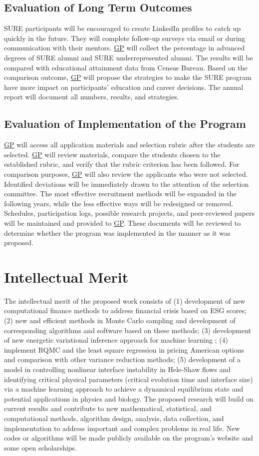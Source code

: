 \documentclass[11pt]{NSFamsart}
\newcommand{\GP}{\hyperlink{GPlink}{GP}\xspace}
\begin{document}
\subsection{Evaluation of Long Term Outcomes}

SURE participants will be encouraged to create LinkedIn profiles to catch up quickly in the future. They will complete follow-up surveys via email or during communication with their mentors. \GP will collect the percentage in advanced degrees of SURE alumni and SURE underrepresented alumni. The results will be compared with educational attainment data from Census Bureau. Based on the comparison outcome, \GP will propose the strategies to make the SURE program have more impact on participants’ education and career decisions. The annual report will document all numbers, results, and strategies.

\subsection{Evaluation of Implementation of the Program}
\GP will access all application materials and selection rubric after the students are selected. \GP will review materials, compare the students chosen to the established rubric, and verify that the rubric criterion has been followed. For comparison purposes, \GP will also
review the applicants who were not selected. Identified deviations will be immediately drawn to the attention of the selection committee. The most effective recruitment methods will be expanded in the following years, while the less effective ways will be redesigned or removed. Schedules, participation logs, possible research projects, and peer-reviewed papers will be maintained and provided to \GP. These documents will be reviewed to determine whether the program was implemented in the manner as it was proposed.

 
\section{Intellectual Merit}
The intellectual merit of the proposed work consists of (1) development of new computational finance methods to address financial crisis based on ESG scores; (2)
new and efficient methods in Monte Carlo sampling and development of corresponding algorithms and software based on these methods; (3) development of new energetic variational inference approach for machine learning ; (4) 
implement RQMC and the least square regression in pricing American options and comparison with other variance reduction methods; (5) development of a model in controlling nonlinear interface instability in Hele-Shaw flows and identifying critical physical parameters (critical evolution time and interface size) via a machine learning approach to achieve a dynamical equilibrium state and potential applications in physics and biology.
The proposed research will build on current results and contribute to new mathematical, statistical,
and computational methods, algorithm design, analysis, data collection, and implementation to address
important and complex problems in real life. New codes or algorithms will be made publicly
available on the program’s website and some open scholarships.
\end{document}
